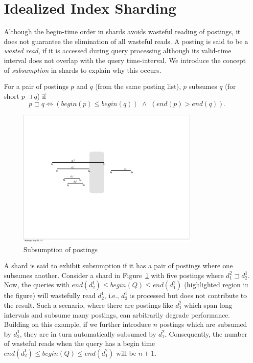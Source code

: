 \section{Idealized Index Sharding}
\label{chap:sharding:sec:ideal_part}

Although the begin-time order in shards avoids wasteful reading of
postings, it does not guarantee the elimination of all wasteful reads. 
A posting is said to be a \emph{wasted read}, if it is accessed during
query processing although its valid-time interval does not overlap
with the query time-interval. We introduce the concept of \emph{subsumption} in shards to explain why this occurs.

\begin{definition}
\label{def:staircase}
For a pair of postings $p$ and $q$ (from the same posting list), $p$ subsumes $q$ (for short $p \sqsupset q$) if
$$
p \sqsupset q \Leftrightarrow  \left( begin (p)\leq begin (q) \right) \,\,\wedge \,\, \left( end(p) > end(q) \right).
$$ 
\end{definition}

\begin{figure}[tb]
	\centering
		\includegraphics[width=0.8\textwidth]{resources/subsumption.pdf}
	\caption{Subsumption of postings}
	 \label{fig:subsumption}
\end{figure}

A shard is said to exhibit subsumption if it has a pair of postings where one subsumes another. Consider a shard in Figure~\ref{fig:subsumption} with 
five postings where $d_1^2 \sqsupset d_2^1$. 
Now, the queries with $end(d_2^1) \leq begin(Q)\leq end(d_1^2)$ (highlighted region in the figure) will wastefully read $d_2^1$, i.e., $d_2^1$ is processed but does not contribute to the result. Such a scenario, where there are postings like $d_1^2$ which span long intervals and subsume many postings, can arbitrarily degrade performance. Building on this example, if we further introduce $n$ postings which are subsumed by $d_2^1$, they are in turn automatically subsumed by $d_1^2$. Consequently, the number of wasteful reads when the query has a begin time $end(d_2^1) \leq begin(Q)\leq end(d_1^2)$ will be $n+1$.

